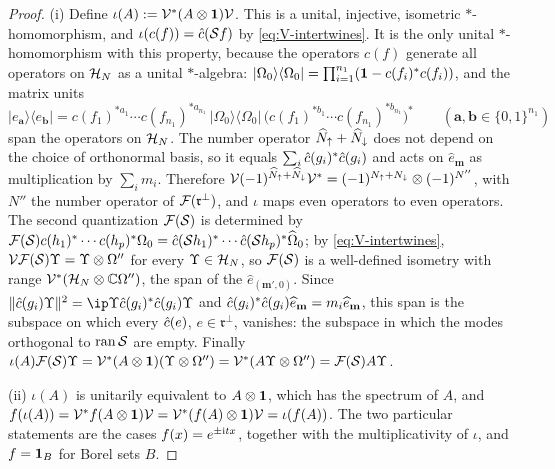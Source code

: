 \begin{proof}
(i) Define $\iota(A):=\mathcal V^*(A\otimes\mathbf{1})\mathcal V$. This is a unital, injective, isometric $*$-homomorphism,
and $\iota(c(f))=\hat{c}(\mathcal{S} f)$ by \eqref{eq:V-intertwines}. It is the only unital $*$-homomorphism with this
property, because the operators $c(f)$ generate all operators on $\mathcal{H}_N$ as a unital $*$-algebra:
$\lvert\Omega_0\rangle\langle\Omega_0\rvert=\prod_{i=1}^{n_1}(\mathbf{1}-c(f_i)^*c(f_i))$, and the matrix units
\[
\lvert e_{\mathbf a}\rangle\langle e_{\mathbf b}\rvert=c(f_1)^{*a_1}\cdots c(f_{n_1})^{*a_{n_1}}\,
\lvert\Omega_0\rangle\langle\Omega_0\rvert\,\bigl(c(f_1)^{*b_1}\cdots c(f_{n_1})^{*b_{n_1}}\bigr)^*\qquad(\mathbf a,\mathbf b\in\{0,1\}^{n_1})
\]
span the operators on $\mathcal{H}_N$. The number operator $\widehat{N}_{{\uparrow}}+\widehat{N}_{{\downarrow}}$ does not depend on the choice of orthonormal
basis, so it equals $\sum_i\hat{c}(g_i)^*\hat{c}(g_i)$ and acts on $\widehat e_{\mathbf m}$ as multiplication by
$\sum_im_i$. Therefore $\mathcal V(-1)^{\widehat{N}_{{\uparrow}}+\widehat{N}_{{\downarrow}}}\mathcal V^*=(-1)^{N_{\uparrow}+N_{\downarrow}}\otimes(-1)^{N''}$, with $N''$ the
number operator of $\mathcal{F}(\mathfrak r^\perp)$, and $\iota$ maps even operators to even operators. The second
quantization $\mathcal{F}(\mathcal{S})$ is determined by $\mathcal{F}(\mathcal{S})c(h_1)^*\cdots c(h_p)^*\Omega_0=\hat{c}(\mathcal{S} h_1)^*\cdots\hat{c}(\mathcal{S} h_p)^*\widehat\Omega_0$;
by \eqref{eq:V-intertwines}, $\mathcal V\mathcal{F}(\mathcal{S})\Upsilon=\Upsilon\otimes\Omega''$ for every $\Upsilon\in\mathcal{H}_N$, so $\mathcal{F}(\mathcal{S})$ is a
well-defined isometry with range $\mathcal V^*(\mathcal{H}_N\otimes\mathbb{C}\Omega'')$, the span of the $\widehat e_{(\mathbf m',0)}$. Since
$\norm{\chat(g_i)\Upsilon}^2=\ip\Upsilon{\chat(g_i)^*\chat(g_i)\Upsilon}$ and $\hat{c}(g_i)^*\hat{c}(g_i)\widehat e_{\mathbf m}=m_i\widehat e_{\mathbf m}$,
this span is the subspace on which every $\hat{c}(e)$, $e\in\mathfrak r^\perp$, vanishes: the subspace in which the modes
orthogonal to $\operatorname{ran}\mathcal{S}$ are empty. Finally
$\iota(A)\mathcal{F}(\mathcal{S})\Upsilon=\mathcal V^*(A\otimes\mathbf{1})(\Upsilon\otimes\Omega'')=\mathcal V^*(A\Upsilon\otimes\Omega'')=\mathcal{F}(\mathcal{S})A\Upsilon$.

(ii) $\iota(A)$ is unitarily equivalent to $A\otimes\mathbf{1}$, which has the spectrum of $A$, and
$f(\iota(A))=\mathcal V^*f(A\otimes\mathbf{1})\mathcal V=\mathcal V^*(f(A)\otimes\mathbf{1})\mathcal V=\iota(f(A))$. The two particular
statements are the cases $f(x)=e^{\pm\mathrm{i} tx}$, together with the multiplicativity of $\iota$, and $f=\mathbf{1}_B$ for
Borel sets $B$.


\end{proof}

